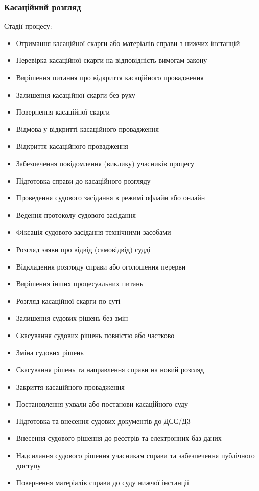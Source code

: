 \documentclass{article}
\begin{document}
\newpage
\subsubsection{Касаційний розгляд}

Стадії процесу:

\begin{itemize}
    \item Отримання касаційної скарги або матеріалів справи з нижчих інстанцій
    \item Перевірка касаційної скарги на відповідність вимогам закону
    \item Вирішення питання про відкриття касаційного провадження
    \item Залишення касаційної скарги без руху
    \item Повернення касаційної скарги
    \item Відмова у відкритті касаційного провадження
    \item Відкриття касаційного провадження
    \item Забезпечення повідомлення (виклику) учасників процесу
    \item Підготовка справи до касаційного розгляду
    \item Проведення судового засідання в режимі офлайн або онлайн
    \item Ведення протоколу судового засідання
    \item Фіксація судового засідання технічними засобами
    \item Розгляд заяви про відвід (самовідвід) судді
    \item Відкладення розгляду справи або оголошення перерви
    \item Вирішення інших процесуальних питань
    \item Розгляд касаційної скарги по суті
    \item Залишення судових рішень без змін
    \item Скасування судових рішень повністю або частково
    \item Зміна судових рішень
    \item Скасування рішень та направлення справи на новий розгляд
    \item Закриття касаційного провадження
    \item Постановлення ухвали або постанови касаційного суду
    \item Підготовка та внесення судових документів до ДСС/Д3
    \item Внесення судового рішення до реєстрів та електронних баз даних
    \item Надсилання судового рішення учасникам справи та забезпечення публічного доступу
    \item Повернення матеріалів справи до суду нижчої інстанції
\end{itemize}
\end{document}
